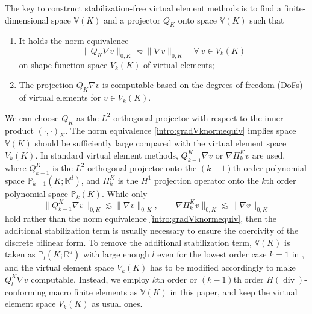 \documentclass[10pt]{amsart}
\renewcommand{\div}{\operatorname{div}}
\numberwithin{equation}{section}
\begin{document}
The key to construct stabilization-free virtual element methods is to find a finite-dimensional space $\mathbb{V}(K)$ and a projector $Q_K$ onto space $\mathbb{V}(K)$ such that
\begin{enumerate}[(C1)]
\item It holds the norm equivalence 
\begin{equation}\label{intro:gradVknormequiv} 
\|Q_{K}\nabla v\|_{0,K}\eqsim \|\nabla v\|_{0,K} \quad \forall~v\in V_k(K)
\end{equation}
on shape function space $V_k(K)$ of virtual elements;
\item The projection $Q_{K}\nabla v$ is computable based on the degrees of freedom (DoFs) of virtual elements for $v\in V_k(K)$.
\end{enumerate}
We can choose $Q_{K}$ as the $L^2$-orthogonal projector with respect to the inner product $(\cdot, \cdot)_K$. The norm equivalence \eqref{intro:gradVknormequiv} implies space $\mathbb{V}(K)$ should be sufficiently large compared with the virtual element space $V_k(K)$.
In standard virtual element methods, $Q_{k-1}^{K}\nabla v$ \cite{BeiraodaVeigaBrezziMariniRusso2016} or $\nabla\Pi_k^{K}v$ \cite{BeiraoBrezziCangianiManziniEtAl2013,BeiraoBrezziMariniRusso2014,AhmadAlsaediBrezziMariniEtAl2013,AyusodeDiosLipnikovManzini2016} are used, where $Q_{k-1}^{K}$ is the $L^2$-orthogonal projector onto the $(k-1)$th order polynomial space $\mathbb P_{k-1}(K; \mathbb{R}^d)$, and $\Pi_k^{K}$ is the $H^1$ projection operator onto the $k$th order polynomial space $\mathbb P_{k}(K)$.
While only
$$
\|Q_{k-1}^{K}\nabla v\|_{0,K}\lesssim \|\nabla v\|_{0,K}, \quad \|\nabla\Pi_k^{K}v\|_{0,K}\lesssim \|\nabla v\|_{0,K}
$$
hold
rather than the norm equivalence \eqref{intro:gradVknormequiv}, then the additional stabilization term is usually necessary to ensure the coercivity of the discrete bilinear form.
To remove the additional stabilization term, $\mathbb{V}(K)$ is taken as $\mathbb P_{l}(K; \mathbb{R}^d)$ with large enough $l$ even for the lowest order case $k=1$ in \cite{BerroneBorioMarcon2021,BerroneBorioMarcon2022,DAltriMirandaPatrunoSacco2021}, and the virtual element space $V_k(K)$ has to be modified accordingly to make $Q_{l}^{K}\nabla v$ computable.
Instead, we employ $k$th order or $(k-1)$th order $H(\div)$-conforming macro finite elements as $\mathbb{V}(K)$ in this paper, and keep the virtual element space $V_k(K)$ as usual ones.
\end{document}

